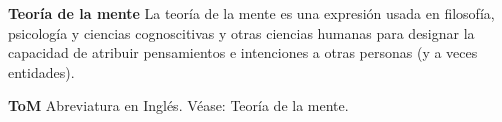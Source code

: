 \newpage
\noindent \textbf{Teoría de la mente}
\quad La teoría de la mente es una expresión usada en filosofía, psicología y ciencias cognoscitivas y otras ciencias humanas para designar la capacidad de atribuir pensamientos e intenciones a otras personas (y a veces entidades).

\vspace*{12pt}

\noindent \textbf{ToM}
\quad Abreviatura en Inglés. Véase: Teoría de la mente.



\newpage

